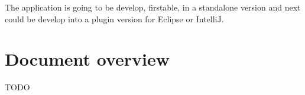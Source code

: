 The application is going to be develop, firstable, in a standalone version and next could be develop into a plugin version for Eclipse or IntelliJ.


\section{Document overview} %
\label{sec:Document overview}

TODO


